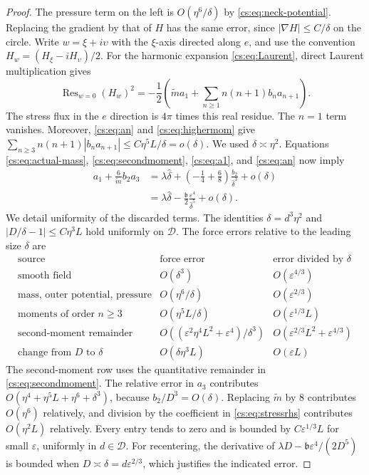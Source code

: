 \documentclass[11pt,reqno]{amsart}
\numberwithin{equation}{section}
\theoremstyle{definition}
\theoremstyle{remark}
\newcommand{\eps}{\varepsilon}
\DeclareMathOperator{\Res}{Res}
\begin{document}
\begin{proof}
The pressure term on the left is $O(\eta^6/\delta)$ by
\eqref{cs:eq:neck-potential}. Replacing the gradient by that of $H$
has the same error, since $|\nabla H|\le C/\delta$ on the circle.
Write $w=\xi+i\upsilon$ with the $\xi$-axis directed along $e$,
and use the convention $H_w=(H_\xi-iH_\upsilon)/2$.
For the harmonic expansion \eqref{cs:eq:Laurent}, direct Laurent
multiplication gives
\[
 \Res_{w=0}(H_w)^2
   =-\frac12\left(\widetilde m a_1+
                    \sum_{n\ge1}n(n+1)b_na_{n+1}\right).
\]
The stress flux in the $e$ direction is $4\pi$ times this real residue.
The $n=1$ term vanishes. Moreover, \eqref{cs:eq:an} and
\eqref{cs:eq:highermom} give
\(\sum_{n\ge3}n(n+1)|b_na_{n+1}| \le C\eta^5L/\delta=o(\delta).\)
We used $\delta\asymp\eta^2$.
Equations \eqref{cs:eq:actual-mass}, \eqref{cs:eq:secondmoment},
\eqref{cs:eq:a1}, and \eqref{cs:eq:an} now imply
\begin{align*}
 a_1+\frac6{\widetilde m} b_2a_3
  &=\lambda\widehat\delta
       +\left(-\frac14+\frac68\right)\frac{b_2}{\widehat\delta^3}
       +o(\delta)\\
  &=\lambda\widehat\delta
       -\frac{\mathfrak b}{2}\frac{\eps^4}{\widehat\delta^5}+o(\delta).
\end{align*}
We detail uniformity of the discarded terms. The identities
$\delta=d^3\eta^2$ and
$|D/\delta-1|\le C\eta^3L$ hold uniformly on $\mathcal D$.
The force errors relative to the leading size $\delta$ are
\[
\begin{array}{l|c|c}
 \text{source} & \text{force error} & \text{error divided by }\delta\\ \hline
 \text{smooth field}&O(\delta^3)&O(\eps^{4/3})\\
 \text{mass, outer potential, pressure}
     &O(\eta^6/\delta)&O(\eps^{2/3})\\
 \text{moments of order }n\ge3
     &O(\eta^5L/\delta)&O(\eps^{1/3}L)\\
 \text{second-moment remainder}
     &O((\eps^2\eta^4L^2+\eps^4)/\delta^3)
     &O(\eps^{2/3}L^2+\eps^{4/3})\\
 \text{change from }D\text{ to }\delta
     &O(\delta\eta^3L)&O(\eps L)
\end{array}
\]
The second-moment row uses the quantitative remainder in
\eqref{cs:eq:secondmoment}. The relative error in $a_3$ contributes
$O(\eta^4+\eta^5L+\eta^6+\delta^3)$, because
$b_2/D^3=O(\delta)$. Replacing $\widetilde m$ by $8$ contributes
$O(\eta^6)$ relatively, and division by the coefficient in
\eqref{cs:eq:stressrhs} contributes $O(\eta^2L)$ relatively.
Every entry tends to zero and is bounded by $C\eps^{1/3}L$ for
small $\eps$, uniformly in $d\in\mathcal D$.
For recentering, the derivative of
$\lambda D-\mathfrak b\eps^4/(2D^5)$ is bounded when
$D\asymp\delta=d\eps^{2/3}$, which justifies the indicated error.


\end{proof}
\end{document}
